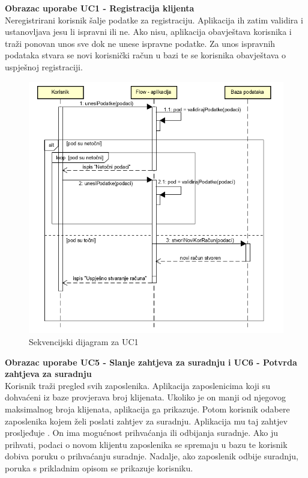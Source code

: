 				
				\textbf{Obrazac uporabe UC1 - Registracija klijenta}\\
				Neregistrirani korisnik šalje podatke za registraciju. Aplikacija ih zatim validira i ustanovljava jesu li ispravni ili ne. Ako nisu, aplikacija obavještava korisnika i traži ponovan unos sve dok ne unese ispravne podatke. Za unos ispravnih podataka stvara se novi korisnički račun u bazi te se korisnika obavještava o uspješnoj registraciji.
				
				
				\begin{figure}[H]
				\includegraphics[scale=1.05]{dijagrami/Sekvencijski/SD1.PNG}
				\centering
				\caption{Sekvencijski dijagram za UC1}
				\label{fig:promjene}
				\end{figure}
				\eject
			
				\textbf{Obrazac uporabe UC5 - Slanje zahtjeva za suradnju i UC6 - Potvrda zahtjeva za suradnju}\\
				Korisnik traži pregled svih zaposlenika. Aplikacija zaposlenicima koji su dohvaćeni iz baze provjerava broj klijenata. Ukoliko je on manji od  njegovog maksimalnog broja klijenata, aplikacija ga prikazuje. Potom korisnik odabere zaposlenika kojem želi poslati zahtjev za suradnju. Aplikacija mu taj zahtjev prosljeđuje . On ima mogućnost prihvaćanja ili odbijanja suradnje. Ako ju prihvati, podaci o novom klijentu zaposlenika se spremaju u bazu te korisnik dobiva poruku o prihvaćanju suradnje. Nadalje, ako zaposlenik odbije suradnju, poruka s prikladnim opisom se prikazuje korisniku.
			
